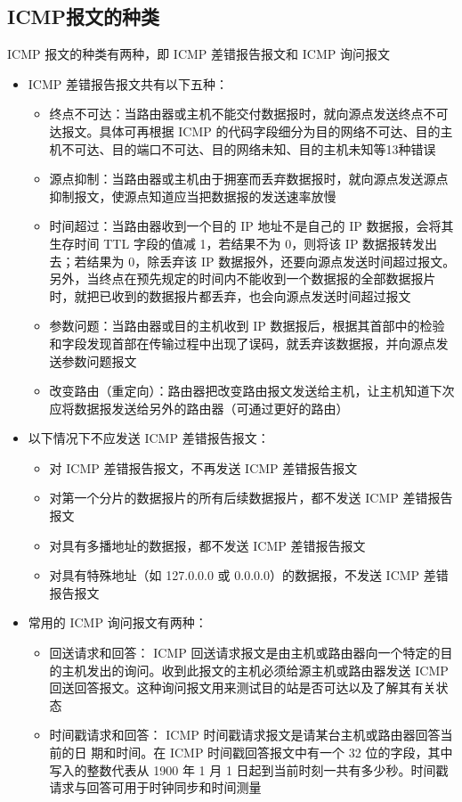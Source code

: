 \documentclass[cs4size,a4paper,10pt]{ctexart}
\begin{document}
	\subsection{ICMP报文的种类}
	ICMP 报文的种类有两种，即 ICMP 差错报告报文和 ICMP 询问报文
	\begin{itemize}
		\item ICMP 差错报告报文共有以下五种：
		\begin{itemize}
			\item 终点不可达：当路由器或主机不能交付数据报时，就向源点发送终点不可达报文。具体可再根据 ICMP 的代码字段细分为目的网络不可达、目的主机不可达、目的端口不可达、目的网络未知、目的主机未知等13种错误
			\item 源点抑制：当路由器或主机由于拥塞而丢弃数据报时，就向源点发送源点抑制报文，使源点知道应当把数据报的发送速率放慢
			\item 时间超过：当路由器收到一个目的 IP 地址不是自己的 IP 数据报，会将其生存时间 TTL 字段的值减 1，若结果不为 0，则将该 IP 数据报转发出去；若结果为 0，除丢弃该 IP 数据报外，还要向源点发送时间超过报文。另外，当终点在预先规定的时间内不能收到一个数据报的全部数据报片时，就把已收到的数据报片都丢弃，也会向源点发送时间超过报文
			\item 参数问题：当路由器或目的主机收到 IP 数据报后，根据其首部中的检验和字段发现首部在传输过程中出现了误码，就丢弃该数据报，并向源点发送参数问题报文
			\item 改变路由（重定向）：路由器把改变路由报文发送给主机，让主机知道下次应将数据报发送给另外的路由器（可通过更好的路由）
		\end{itemize}
		\item 以下情况下不应发送 ICMP 差错报告报文：
		\begin{itemize}
			\item 对 ICMP 差错报告报文，不再发送 ICMP 差错报告报文
			\item 对第一个分片的数据报片的所有后续数据报片，都不发送 ICMP 差错报告报文
			\item 对具有多播地址的数据报，都不发送 ICMP 差错报告报文
			\item 对具有特殊地址（如 127.0.0.0 或 0.0.0.0）的数据报，不发送 ICMP 差错报告报文
		\end{itemize}
		\item 常用的 ICMP 询问报文有两种：
		\begin{itemize}
			\item 回送请求和回答： ICMP 回送请求报文是由主机或路由器向一个特定的目的主机发出的询问。收到此报文的主机必须给源主机或路由器发送 ICMP 回送回答报文。这种询问报文用来测试目的站是否可达以及了解其有关状态
			\item 时间戳请求和回答： ICMP 时间戳请求报文是请某台主机或路由器回答当前的日 期和时间。在 ICMP 时间戳回答报文中有一个 32 位的字段，其中写入的整数代表从 1900 年 1 月 1 日起到当前时刻一共有多少秒。时间戳请求与回答可用于时钟同步和时间测量
		\end{itemize}
	\end{itemize}
\end{document}
